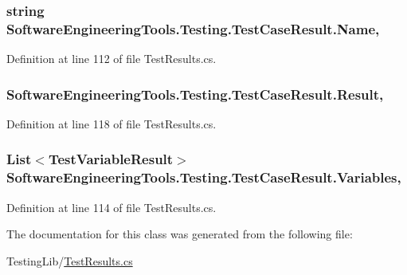 \hypertarget{class_software_engineering_tools_1_1_testing_1_1_test_case_result_a45cc74e60da35652a786c1f53cacff7a}{
\subsubsection[{Name}]{\setlength{\rightskip}{0pt plus 5cm}string Software\+Engineering\+Tools.\+Testing.\+Test\+Case\+Result.\+Name\hspace{0.3cm}{\ttfamily [get]}, {\ttfamily [set]}}}\label{class_software_engineering_tools_1_1_testing_1_1_test_case_result_a45cc74e60da35652a786c1f53cacff7a}


Definition at line 112 of file Test\+Results.\+cs.

\hypertarget{class_software_engineering_tools_1_1_testing_1_1_test_case_result_a69e1a0107ef4fe18d2f9adab43cb18e1}{
\subsubsection[{Result}]{ Software\+Engineering\+Tools.\+Testing.\+Test\+Case\+Result.\+Result\hspace{0.3cm}{\ttfamily [get]}, {\ttfamily [set]}}}\label{class_software_engineering_tools_1_1_testing_1_1_test_case_result_a69e1a0107ef4fe18d2f9adab43cb18e1}


Definition at line 118 of file Test\+Results.\+cs.

\hypertarget{class_software_engineering_tools_1_1_testing_1_1_test_case_result_ab0c2ca15dc89f3d4ff0ade1087cb6d61}{
\subsubsection[{Variables}]{\setlength{\rightskip}{0pt plus 5cm}List$<${\bf Test\+Variable\+Result}$>$ Software\+Engineering\+Tools.\+Testing.\+Test\+Case\+Result.\+Variables\hspace{0.3cm}{\ttfamily [get]}, {\ttfamily [set]}}}\label{class_software_engineering_tools_1_1_testing_1_1_test_case_result_ab0c2ca15dc89f3d4ff0ade1087cb6d61}


Definition at line 114 of file Test\+Results.\+cs.



The documentation for this class was generated from the following file\+:\begin{DoxyCompactItemize}
\item 
Testing\+Lib/\hyperlink{_test_results_8cs}{Test\+Results.\+cs}\end{DoxyCompactItemize}
